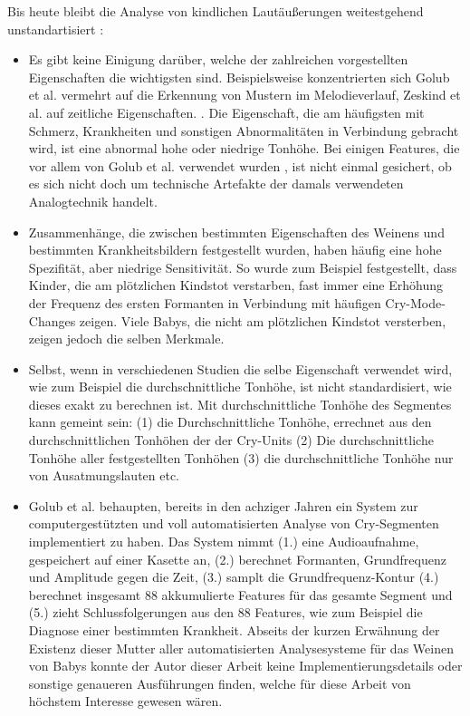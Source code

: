 Bis heute bleibt die Analyse von kindlichen Lautäußerungen weitestgehend unstandartisiert \cite[S. 142]{signal}:
\begin{itemize}
	\item Es gibt keine Einigung darüber, welche der zahlreichen vorgestellten Eigenschaften die wichtigsten sind. Beispielsweise konzentrierten sich Golub et al. \cite{cryModel} vermehrt auf die Erkennung von Mustern im Melodieverlauf, Zeskind et al. auf zeitliche Eigenschaften. \cite{rythmic}. Die Eigenschaft, die am häufigsten mit Schmerz, Krankheiten und sonstigen Abnormalitäten in Verbindung gebracht wird, ist eine abnormal hohe oder niedrige Tonhöhe. Bei einigen Features, die vor allem von Golub et al. verwendet wurden \cite{cryModel}, ist nicht einmal gesichert, ob es sich nicht doch um technische Artefakte der damals verwendeten Analogtechnik handelt. \cite[S. 84 - 85]{parentalPerception}
	\item Zusammenhänge, die zwischen bestimmten Eigenschaften des Weinens und bestimmten Krankheitsbildern festgestellt wurden, haben häufig eine hohe Spezifität, aber niedrige Sensitivität. So wurde zum Beispiel festgestellt, dass Kinder, die am plötzlichen Kindstot verstarben, fast immer eine Erhöhung der Frequenz des ersten Formanten in Verbindung mit häufigen Cry-Mode-Changes zeigen. Viele Babys, die nicht am plötzlichen Kindstot versterben, zeigen jedoch die selben Merkmale.\cite[S. 85]{parentalPerception}
	\item Selbst, wenn in verschiedenen Studien die selbe Eigenschaft verwendet wird, wie zum Beispiel die durchschnittliche Tonhöhe, ist nicht standardisiert, wie dieses exakt zu berechnen ist. Mit \glqq durchschnittliche Tonhöhe des Segmentes\grqq{} kann gemeint sein: (1) die Durchschnittliche Tonhöhe, errechnet aus den durchschnittlichen Tonhöhen der der Cry-Units (2) Die durchschnittliche Tonhöhe aller festgestellten Tonhöhen (3) die durchschnittliche Tonhöhe nur von Ausatmungslauten etc.
	\item Golub et al. behaupten, bereits in den achziger Jahren ein System zur computergestützten und voll automatisierten Analyse von Cry-Segmenten implementiert zu haben. Das System nimmt (1.) eine Audioaufnahme, gespeichert auf einer Kasette an, (2.) berechnet Formanten, Grundfrequenz und Amplitude gegen die Zeit, (3.) samplt die Grundfrequenz-Kontur (4.) berechnet insgesamt 88 akkumulierte Features für das gesamte Segment und (5.) zieht Schlussfolgerungen aus den 88 Features, wie zum Beispiel die Diagnose einer bestimmten Krankheit.\cite[S. 75 - 76]{cryModel} Abseits der kurzen Erwähnung der Existenz dieser \grqq Mutter aller automatisierten Analysesysteme für das Weinen von Babys\grqq{} konnte der Autor dieser Arbeit keine Implementierungsdetails oder sonstige genaueren Ausführungen finden, welche für diese Arbeit von höchstem Interesse gewesen wären.
\end{itemize}

